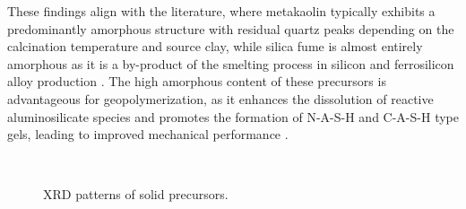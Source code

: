 These findings align with the literature, where metakaolin typically exhibits a predominantly amorphous structure with residual quartz peaks depending on the calcination temperature and source clay, while silica fume is almost entirely amorphous as it is a by-product of the smelting process in silicon and ferrosilicon alloy production \cite{pachecotorgal2014handbook}.
The high amorphous content of these precursors is advantageous for geopolymerization, as it enhances the dissolution of reactive aluminosilicate species and promotes the formation of N-A-S-H and C-A-S-H type gels, leading to improved mechanical performance \cite{qin2022onepart}.

\begin{figure}[H]
    \centering
     \\
    \caption{XRD patterns of solid precursors.}
    \label{fig:xrd_precursors}
\end{figure}

